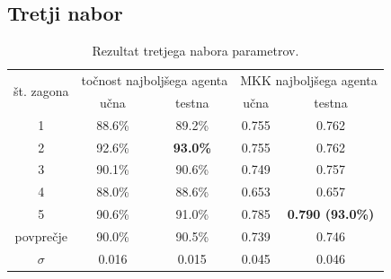 \subsection{Tretji nabor}\label{subsec:dodatek-statlog-tretji-nabor}
\begin{table}[H]
    \begin{center}
        \begin{tabular}{|| c | c c || c c ||}
            \hline
            \multirow{2}{*}{št. zagona} & \multicolumn{2}{c||}{točnost najboljšega agenta} & \multicolumn{2}{c||}{MKK najboljšega agenta} \\ \cline{2-5}
            & učna   & testna          & učna  & testna                  \\
            \hline
            1         & 88.6\% & 89.2\%          & 0.755 & 0.762                   \\
            \hline
            2         & 92.6\% & \textbf{93.0\%} & 0.755 & 0.762                   \\
            \hline
            3         & 90.1\% & 90.6\%          & 0.749 & 0.757                   \\
            \hline
            4         & 88.0\% & 88.6\%          & 0.653 & 0.657                   \\
            \hline
            5         & 90.6\% & 91.0\%          & 0.785 & \textbf{0.790 (93.0\%)} \\
            \hline
            povprečje & 90.0\% & 90.5\%          & 0.739 & 0.746                   \\
            \hline
            $\sigma$  & 0.016  & 0.015           & 0.045 & 0.046                   \\
            \hline
        \end{tabular}
    \end{center}
    \caption{Rezultat tretjega nabora parametrov.}
    \label{tab:statlog_result_3}
\end{table}

